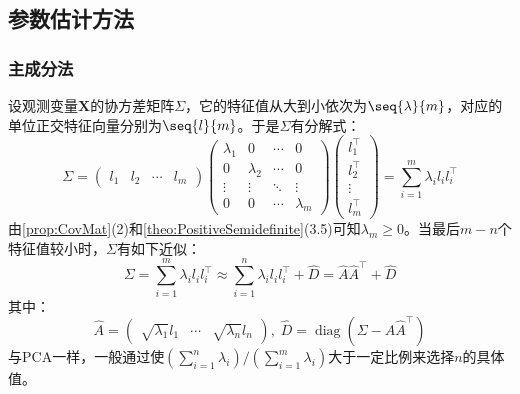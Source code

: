 \subsection{参数估计方法}
\subsubsection{主成分法}
\begin{method}
	设观测变量$\mathbf{X}$的协方差矩阵$\Sigma$，它的特征值从大到小依次为$\seq{\lambda}{m}$，对应的单位正交特征向量分别为$\seq{l}{m}$。于是$\Sigma$有分解式：
	\begin{equation*}
		\Sigma=
		\begin{pmatrix}
			l_1 & l_2 & \cdots &l_m
		\end{pmatrix}
		\begin{pmatrix}
			\lambda_1 & 0 & \cdots & 0 \\
			0 & \lambda_2 & \cdots & 0 \\
			\vdots & \vdots & \ddots & \vdots \\
			0 & 0 & \cdots & \lambda_m
		\end{pmatrix}
		\begin{pmatrix}
			l_1^{\top} \\
			l_2^{\top} \\
			\vdots \\
			l_m^{\top}
		\end{pmatrix}
		=\sum_{i=1}^{m}\lambda_il_il_i^{\top}
	\end{equation*}
	由\cref{prop:CovMat}(2)和\cref{theo:PositiveSemidefinite}(3.5)可知$\lambda_m\geqslant0$。当最后$m-n$个特征值较小时，$\Sigma$有如下近似：
	\begin{equation*}
		\Sigma=\sum_{i=1}^{m}\lambda_il_il_i^{\top}\approx\sum_{i=1}^{n}\lambda_il_il_i^{\top}+\hat{D}=\hat{A}\hat{A}^{\top}+\hat{D}
	\end{equation*}
	其中：
	\begin{equation*}
		\hat{A}=
		\begin{pmatrix}
			\sqrt{\lambda_1}l_1 & \cdots & \sqrt{\lambda_n}l_n
		\end{pmatrix},\;
		\hat{D}=\operatorname{diag}(\Sigma-\hat{A}\hat{A}^{\top})
	\end{equation*}
	与PCA一样，一般通过使$\left(\sum\limits_{i=1}^{n}\lambda_i\right)\Big/\left(\sum\limits_{i=1}^{m}\lambda_i\right)$大于一定比例来选择$n$的具体值。
\end{method}

